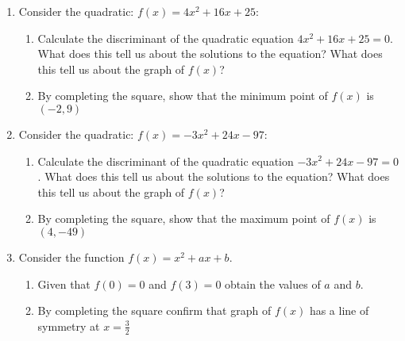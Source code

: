 \begin{enumerate}
\begin{enumerate}
\end{enumerate}

\item 

Consider the quadratic: \(f(x)=4x ^ 2 + 16x + 25\):
\begin{enumerate}

\item 

Calculate the discriminant of the quadratic equation \(4x ^ 2 + 16x + 25 =
0\). What does this tell us about the solutions to the equation? What
does this tell us about the graph of \(f(x)\)?

\item 

By completing the square, show that the minimum point of \(f(x)\) is
\(\left(-2, 9\right)\)

\end{enumerate}

\item 

Consider the quadratic: \(f(x)=-3x ^ 2 + 24x - 97\):
\begin{enumerate}

\item 

Calculate the discriminant of the quadratic equation \(-3x ^ 2 + 24x - 97 =
0\). What does this tell us about the solutions to the equation? What
does this tell us about the graph of \(f(x)\)?

\item 

By completing the square, show that the maximum point of \(f(x)\) is
\(\left(4, -49\right)\)

\end{enumerate}

\item 

Consider the function \(f(x) = x^ 2 + a x + b\).
\begin{enumerate}

\item 

Given that \(f(0) = 0\) and \(f(3) = 0\) obtain the values of \(a\) and \(b\).

\item 

By completing the square confirm that graph of \(f(x)\) has a line of symmetry at \(x=\frac{3}{2}\)

\end{enumerate}

\end{enumerate}

